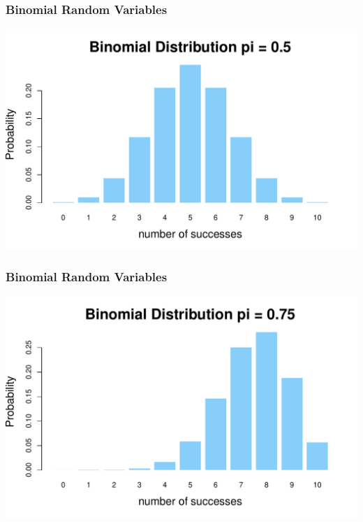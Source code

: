 \documentclass[aspectratio=169]{beamer}
\theoremstyle{principle}
\begin{document}
\begin{frame}
\frametitle{Binomial Random Variables}

\begin{center}
\includegraphics[scale=0.5]{binomial_5.pdf}
\end{center}

\end{frame}

\begin{frame}
\frametitle{Binomial Random Variables}

\begin{center}
\includegraphics[scale=0.5]{binomial_75.pdf}
\end{center}

\end{frame}
\end{document}
